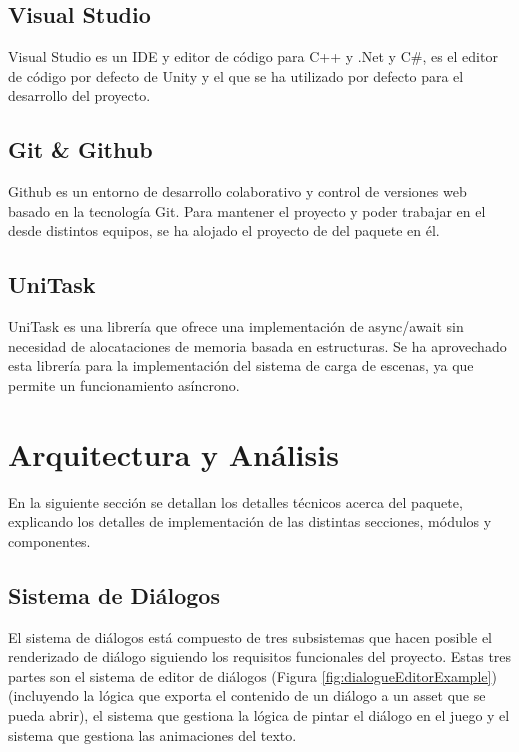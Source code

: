 \subsection{Visual Studio}

Visual Studio\cite{visualstudio} es un IDE y editor de código para C++ y .Net y C\#, es el editor de código por defecto de Unity y el que se ha utilizado por defecto para el desarrollo del proyecto. 

\subsection{Git \& Github}

Github\cite{github} es un entorno de desarrollo colaborativo y control de versiones web basado en la tecnología Git. Para mantener el proyecto y poder trabajar en el desde distintos equipos, se ha alojado el proyecto de del paquete\cite{Repo} en él.

\subsection{UniTask}

UniTask\cite{UniTask} es una librería que ofrece una implementación de async/await sin necesidad de alocataciones de memoria basada en estructuras. Se ha aprovechado esta librería para la implementación del sistema de carga de escenas, ya que permite un funcionamiento asíncrono.

\section{Arquitectura y Análisis}
En la siguiente sección se detallan los detalles técnicos acerca del paquete, explicando los detalles de implementación de las distintas secciones, módulos y componentes.

\subsection{Sistema de Diálogos}
El sistema de diálogos está compuesto de tres subsistemas que hacen posible el renderizado de diálogo siguiendo los requisitos funcionales del proyecto. Estas tres partes son
el sistema de editor de diálogos (Figura \ref{fig:dialogueEditorExample}) (incluyendo la lógica que exporta el contenido de un diálogo a un asset que se pueda abrir), el sistema que gestiona la lógica de pintar el 
diálogo en el juego y el sistema que gestiona las animaciones del texto.

